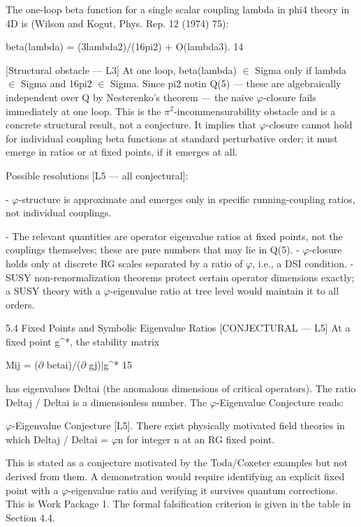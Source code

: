   The one-loop beta function for a single scalar coupling lambda in phi4 theory in 4D is
  (Wilson and Kogut, Phys. Rep. 12 (1974) 75):

  beta(lambda) = (3lambda2)/(16pi2) + O(lambda3). 14

  [Structural obstacle --- L3] At one loop, beta(lambda) $\in$ Sigma only if lambda $\in$ Sigma
  and 16pi2 $\in$ Sigma. Since pi2 notin Q(5) --- these are algebraically independent over Q
  by Nesterenko's theorem --- the naive $\varphi$-closure fails immediately at one loop. This is
  the $\pi^{2}$-incommensurability obstacle and is a concrete structural result, not a conjecture.
  It implies that $\varphi$-closure cannot hold for individual coupling beta functions at standard
  perturbative order; it must emerge in ratios or at fixed points, if it emerges at all.

  Possible resolutions [L5 --- all conjectural]:

  - $\varphi$-structure is approximate and emerges only in specific running-coupling ratios, not
  individual couplings.

  - The relevant quantities are operator eigenvalue ratios at fixed points, not the
  couplings themselves; these are pure numbers that may lie in Q(5).
  - $\varphi$-closure holds only at discrete RG scales separated by a ratio of $\varphi$, i.e., a DSI
  condition.
  - SUSY non-renormalization theorems protect certain operator dimensions exactly; a
  SUSY theory with a $\varphi$-eigenvalue ratio at tree level would maintain it to all orders.

  5.4 Fixed Points and Symbolic Eigenvalue Ratios [CONJECTURAL ---
  L5]
  At a fixed point g\textasciicircum{}*, the stability matrix

  Mij = ($\partial$ betai)/($\partial$ gj)|g\textasciicircum{}* 15

  has eigenvalues Deltai (the anomalous dimensions of critical operators). The ratio
  Deltaj / Deltai is a dimensionless number. The $\varphi$-Eigenvalue Conjecture reads:

          $\varphi$-Eigenvalue Conjecture [L5]. There exist physically motivated field theories in
          which Deltaj / Deltai = $\varphi$n for integer n at an RG fixed point.

  This is stated as a conjecture motivated by the Toda/Coxeter examples but not derived
  from them. A demonstration would require identifying an explicit fixed point with a
  $\varphi$-eigenvalue ratio and verifying it survives quantum corrections. This is Work Package
  1. The formal falsification criterion is given in the table in Section 4.4.

